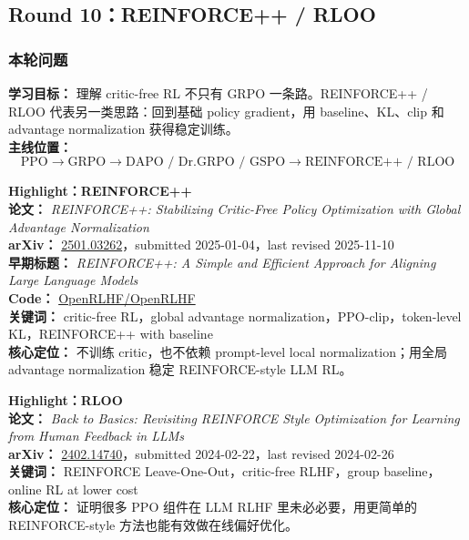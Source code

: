 
\subsection{Round 10：REINFORCE++ / RLOO}

\subsubsection{本轮问题}

\begin{conceptbox}
\textbf{学习目标：} 理解 critic-free RL 不只有 GRPO 一条路。REINFORCE++ / RLOO 代表另一类思路：回到基础 policy gradient，用 baseline、KL、clip 和 advantage normalization 获得稳定训练。\\
\textbf{主线位置：}
\[
\text{PPO}
\to
\text{GRPO}
\to
\text{DAPO / Dr.GRPO / GSPO}
\to
\text{REINFORCE++ / RLOO}
\]
\end{conceptbox}

\begin{conceptbox}
\textbf{Highlight：REINFORCE++}\\
\textbf{论文：} \emph{REINFORCE++: Stabilizing Critic-Free Policy Optimization with Global Advantage Normalization}\\
\textbf{arXiv：} \href{https://arxiv.org/abs/2501.03262}{2501.03262}，submitted 2025-01-04，last revised 2025-11-10\\
\textbf{早期标题：} \emph{REINFORCE++: A Simple and Efficient Approach for Aligning Large Language Models}\\
\textbf{Code：} \href{https://github.com/OpenRLHF/OpenRLHF}{OpenRLHF/OpenRLHF}\\
\textbf{关键词：} critic-free RL，global advantage normalization，PPO-clip，token-level KL，REINFORCE++ with baseline\\
\textbf{核心定位：} 不训练 critic，也不依赖 prompt-level local normalization；用全局 advantage normalization 稳定 REINFORCE-style LLM RL。
\end{conceptbox}

\begin{conceptbox}
\textbf{Highlight：RLOO}\\
\textbf{论文：} \emph{Back to Basics: Revisiting REINFORCE Style Optimization for Learning from Human Feedback in LLMs}\\
\textbf{arXiv：} \href{https://arxiv.org/abs/2402.14740}{2402.14740}，submitted 2024-02-22，last revised 2024-02-26\\
\textbf{关键词：} REINFORCE Leave-One-Out，critic-free RLHF，group baseline，online RL at lower cost\\
\textbf{核心定位：} 证明很多 PPO 组件在 LLM RLHF 里未必必要，用更简单的 REINFORCE-style 方法也能有效做在线偏好优化。
\end{conceptbox}

